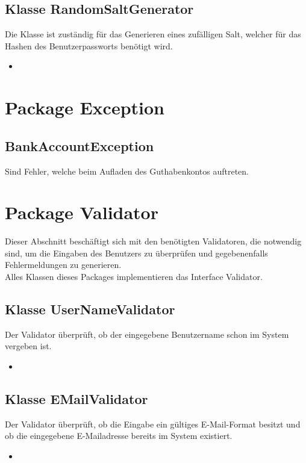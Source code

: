 \documentclass[a4paper]{scrreprt}
\begin{document}
	\subsection{Klasse RandomSaltGenerator}
	Die Klasse ist zuständig für das Generieren eines zufälligen Salt, welcher für das Hashen des Benutzerpassworts benötigt wird.
	\begin{itemize}
		\item {}
	\end{itemize} 

	\section{Package Exception}
	\subsection{BankAccountException}
	Sind Fehler, welche beim Aufladen des Guthabenkontos auftreten. 
	
	\section{Package Validator}
	Dieser Abschnitt beschäftigt sich mit den benötigten Validatoren, die notwendig sind, um die Eingaben des Benutzers zu überprüfen und gegebenenfalls Fehlermeldungen zu generieren.\\
	Alles Klassen dieses Packages implementieren das Interface Validator.
		
	\subsection{Klasse UserNameValidator}
	Der Validator überprüft, ob der eingegebene Benutzername schon im System vergeben ist.
	\begin{itemize}
		\item \override
	\end{itemize}
	
	\subsection{Klasse EMailValidator}
	Der Validator überprüft, ob die Eingabe ein gültiges E-Mail-Format besitzt und ob die eingegebene E-Mailadresse bereits im System existiert.
	\begin{itemize}
		\item \override
	\end{itemize}
	
\end{document}
